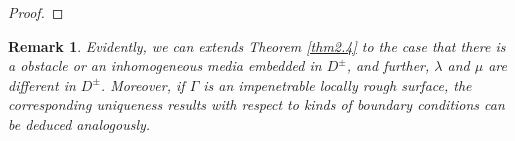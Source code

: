\documentclass[final,reqno]{siamltex}
\newcommand{\Div}{{\rm Div\,}}
\newcommand{\om}{\omega}
\newcommand{\pa}{\partial}
\newcommand{\ov}{\overline}
\newcommand{\I}{{\rm Im}}
\newcommand{\curl}{{\rm curl\,}}
\newcommand{\ben}{\begin{eqnarray*}}
\newcommand{\enn}{\end{eqnarray*}}
\newtheorem{remark}[theorem]{Remark}
\begin{document}
\begin{proof}
\end{proof}
\begin{remark}\label{rem2.5}
	Evidently, we can extends Theorem {\rm \ref{thm2.4}} to the case that there is a obstacle or an inhomogeneous media embedded in $D^\pm$, and further, $\lambda$ and $\mu$ are different in $D^\pm$. 
	Moreover, if $\Gamma$ is an impenetrable locally rough surface, the corresponding uniqueness results with respect to kinds of boundary conditions can be deduced analogously. 
\end{remark}
\end{document}
